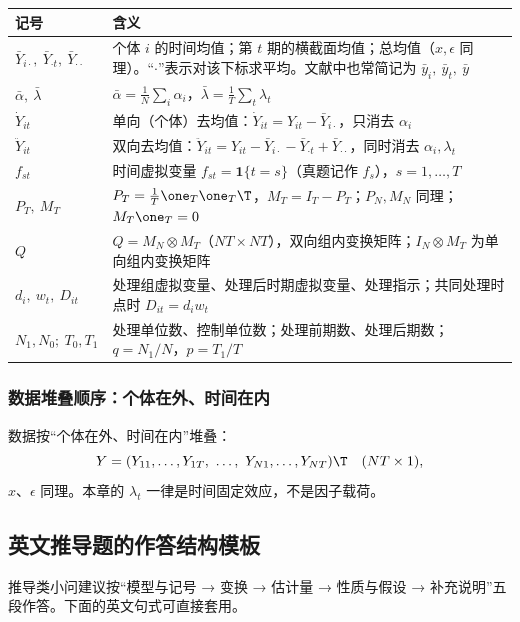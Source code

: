 \begin{center}
\small
\begin{tabularx}{\linewidth}{lL}
\toprule
记号 & 含义\\
\midrule
$\bar Y_{i\cdot},\ \bar Y_{\cdot t},\ \bar Y_{\cdot\cdot}$ & 个体 $i$ 的时间均值；第 $t$ 期的横截面均值；总均值（$x,\epsilon$ 同理）。“$\cdot$”表示对该下标求平均。文献中也常简记为 $\bar y_i,\ \bar y_t,\ \bar y$\\
$\bar\alpha,\ \bar\lambda$ & $\bar\alpha=\frac1N\sum_i\alpha_i$，$\bar\lambda=\frac1T\sum_t\lambda_t$\\
$\dot Y_{it}$ & 单向（个体）去均值：$\dot Y_{it}=Y_{it}-\bar Y_{i\cdot}$，只消去 $\alpha_i$\\
$\ddot Y_{it}$ & 双向去均值：$\ddot Y_{it}=Y_{it}-\bar Y_{i\cdot}-\bar Y_{\cdot t}+\bar Y_{\cdot\cdot}$，同时消去 $\alpha_i,\lambda_t$\\
$f_{st}$ & 时间虚拟变量 $f_{st}=\mathbf{1}\{t=s\}$（真题记作 $f_s$），$s=1,\dots,T$\\
$P_T,\ M_T$ & $P_T=\frac1T\one_T\one_T\T$，$M_T=I_T-P_T$；$P_N,M_N$ 同理；$M_T\one_T=0$\\
$Q$ & $Q=M_N\otimes M_T$（$NT\times NT$），双向组内变换矩阵；$I_N\otimes M_T$ 为单向组内变换矩阵\\
$d_i,\ w_t,\ D_{it}$ & 处理组虚拟变量、处理后时期虚拟变量、处理指示；共同处理时点时 $D_{it}=d_iw_t$\\
$N_1,N_0;\ T_0,T_1$ & 处理单位数、控制单位数；处理前期数、处理后期数；$q=N_1/N$，$p=T_1/T$\\
\bottomrule
\end{tabularx}
\label{tab:U17a-notation}
\end{center}

\subsubsection{数据堆叠顺序：个体在外、时间在内}
数据按“个体在外、时间在内”堆叠：
\[
Y=(Y_{11},\dots,Y_{1T},\ \dots,\ Y_{N1},\dots,Y_{NT})\T\quad(NT\times1),
\]
$x$、$\epsilon$ 同理。本章的 $\lambda_t$ 一律是时间固定效应，不是因子载荷。

\subsection{英文推导题的作答结构模板}

推导类小问建议按“模型与记号 → 变换 → 估计量 → 性质与假设 → 补充说明”五段作答。下面的英文句式可直接套用。

